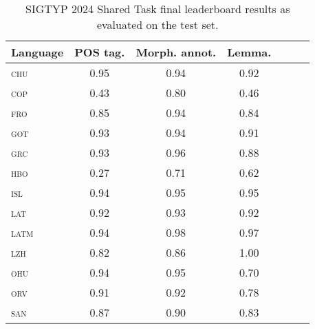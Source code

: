 \documentclass{../acl_latex.tex}
\begin{document}
\begin{table*}[t]
    \centering
    \begin{tabular}{lcccccc}
        \toprule
        Language      & POS tag. & Morph. annot. & Lemma. \\ \midrule
        \textsc{chu}  & 0.95     & 0.94          & 0.92   \\
        \textsc{cop}  & 0.43     & 0.80          & 0.46   \\
        \textsc{fro}  & 0.85     & 0.94          & 0.84   \\
        \textsc{got}  & 0.93     & 0.94          & 0.91   \\
        \textsc{grc}  & 0.93     & 0.96          & 0.88   \\
        \textsc{hbo}  & 0.27     & 0.71          & 0.62   \\
        \textsc{isl}  & 0.94     & 0.95          & 0.95   \\
        \textsc{lat}  & 0.92     & 0.93          & 0.92   \\
        \textsc{latm} & 0.94     & 0.98          & 0.97   \\
        \textsc{lzh}  & 0.82     & 0.86          & 1.00   \\
        \textsc{ohu}  & 0.94     & 0.95          & 0.70   \\
        \textsc{orv}  & 0.91     & 0.92          & 0.78   \\
        \textsc{san}  & 0.87     & 0.90          & 0.83   \\ \bottomrule
    \end{tabular}
    \caption{
        SIGTYP 2024 Shared Task final leaderboard results as evaluated on the test set.
    }
    \label{table:main_results}
\end{table*}
\end{document}
